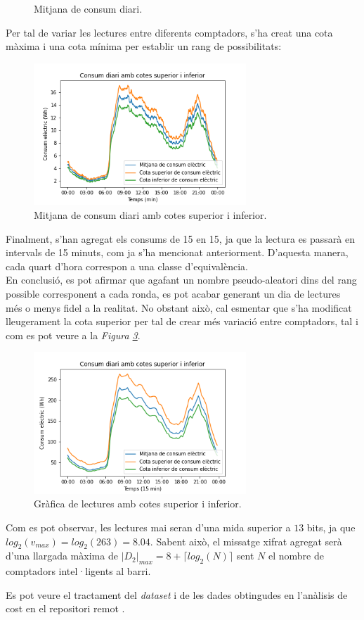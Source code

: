 \begin{itemize}
\begin{figure}[H]
	\caption{Mitjana de consum diari.}
	\label{fig:consumptionmin1}
\end{figure}
Per tal de variar les lectures entre diferents comptadors, s'ha creat una cota màxima i una cota mínima per establir un rang de possibilitats:
\begin{figure}[H]
	\centering
	\includegraphics[width=8cm]{imgs/cost/consumptionmin2.png}
	\caption{Mitjana de consum diari amb cotes superior i inferior.}
	\label{fig:consumptionmin2}
\end{figure}
Finalment,  s'han agregat els consums de 15 en 15, ja que la lectura es passarà en intervals de 15 minuts, com ja s'ha mencionat anteriorment. D'aquesta manera, cada quart d'hora correspon a una classe d'equivalència. \\
En conclusió, es pot afirmar que agafant un nombre pseudo-aleatori dins del rang possible corresponent a cada ronda, es pot acabar generant un dia de lectures més o menys fidel a la realitat. No obstant això, cal esmentar que s'ha modificat lleugerament la cota superior per tal de crear més variació entre comptadors, tal i com es pot veure a la \textit{Figura \ref{fig:consumption2}}.
\begin{figure}[H]
	\centering
	\includegraphics[width=8cm]{imgs/cost/consumption2.png}
	\caption{Gràfica de lectures amb cotes superior i inferior.}
	\label{fig:consumption2}
\end{figure}
Com es pot observar, les lectures mai seran d'una mida superior a $13$ bits, ja que $log_2(v_{max}) = log_2(263) = 8.04$. Sabent això, el missatge xifrat agregat serà d'una llargada màxima de $|D_2|_{max} = 8 + \lceil log_2(N) \rceil$ sent $N$ el nombre de comptadors intel·ligents al barri.
\end{itemize}
Es pot veure el tractament del \textit{dataset} i de les dades obtingudes en l'anàlisis de cost en el repositori remot \cite{lab-recsi}.
